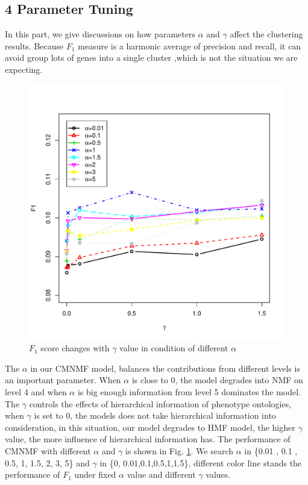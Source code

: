 \documentclass{bmcart}
\begin{document}
\subsection*{\textbf{4 Parameter Tuning}}
In this part, we give discussions on how parameters $\alpha$ and $\gamma$ affect the clustering results. Because $F_1$ measure is a  harmonic average of precision and recall, it can avoid group lots of genes into a single cluster ,which is not the situation we are expecting.
\begin{figure}[!h]
  \begin{minipage}[t]{0.7\linewidth}
    \includegraphics[width=\linewidth,origin = l]{DrawPictures/alpha-gamma.pdf}
  \end{minipage}
  \caption{$F_1$ score changes with $\gamma$ value in condition of different $\alpha$}
  \label{fig:alpha_gamma}
\end{figure}
The $\alpha$ in our CMNMF model, balances the contributions from different levels is an important parameter. When $\alpha$ is close to 0, the model degrades into NMF on level 4 and when $\alpha$ is big enough information from level 5 dominates the model. The $\gamma$ controls the effects of hierarchical information of phenotype ontologies, when $\gamma$ is set to 0, the models does not take hierarchical information into consideration, in this situation, our model degrades to HMF model, the higher $\gamma$ value, the more influence of hierarchical information has.
 The performance of CMNMF with different $\alpha$ and $\gamma$ is shown in Fig. \ref{fig:alpha_gamma}. We search $\alpha$ in \{0.01 , 0.1 , 0.5, 1, 1.5, 2, 3, 5\} and $\gamma$ in \{0, 0.01,0.1,0.5,1,1.5\}, different color line stands the performance of $F_1$ under fixed $\alpha$ value and different $\gamma$ values.
\end{document}
